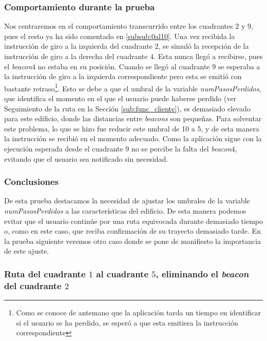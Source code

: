 \subsubsection*{Comportamiento durante la prueba}

Nos centraremos en el comportamiento transcurrido entre los cuadrantes $2$ y $9$, pues el resto ya ha sido comentado en \ref{subsub:0al10}. Una vez recibida la instrucción de giro a la izquierda del cuadrante $2$, se simuló la recepción de la instrucción de giro a la derecha del cuadrante $4$. Esta nunca llegó a recibirse, pues el \textit{beacon$4$} no estaba en su posición. Cuando se llegó al cuadrante $9$ se esperaba a la instrucción de giro a la izquierda correspondiente pero esta se emitió con bastante retraso\footnote{Como se conoce de antemano que la aplicación tarda un tiempo en identificar si el usuario se ha perdido, se esperó a que esta emitiera la instrucción correspondiente}. Esto se debe a que el umbral de la variable \textit{numPasosPerdidos}, que identifica el momento en el que el usuario puede haberse perdido (ver Seguimiento de la ruta en la Sección \ref{sub:func_cliente}), es demasiado elevado para este edificio, donde las distancias entre \textit{beacons} son pequeñas. Para solventar este problema, lo que se hizo fue reducir este umbral de 10 a 5, y de esta manera la instrucción se recibió en el momento adecuado. Como la aplicación sigue con la ejecución esperada desde el cuadrante $9$ no se percibe la falta del \textit{beacon$4$}, evitando que el usuario sea notificado sin necesidad.


\subsubsection*{Conclusiones}

De esta prueba destacamos la necesidad de ajustar los umbrales de la variable \textit{numPasosPerdidos} a las características del edificio. De esta manera podemos evitar que el usuario continúe por una ruta equivocada durante demasiado tiempo o, como en este caso, que reciba confirmación de su trayecto demasiado tarde. En la prueba siguiente veremos otro caso donde se pone de manifiesto la importancia de este ajuste.


\subsubsection{Ruta del cuadrante $1$ al cuadrante $5$, eliminando el \textit{beacon} del cuadrante $2$}
\label{subsub:1al5sin2}

